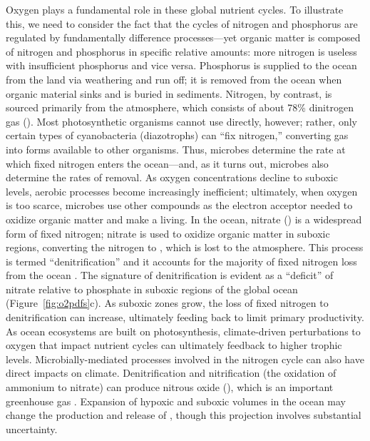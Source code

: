 \documentclass{report_chapter}
\begin{document}
Oxygen plays a fundamental role in these global nutrient cycles.
To illustrate this, we need to consider the fact that the cycles of nitrogen and phosphorus are regulated by fundamentally difference processes---yet organic matter is composed of nitrogen and phosphorus in specific relative amounts: more nitrogen is useless with insufficient phosphorus and vice versa.
Phosphorus is supplied to the ocean from the land via weathering and run off; it is removed from the ocean when organic material sinks and is buried in sediments.
Nitrogen, by contrast, is sourced primarily from the atmosphere, which consists of about 78\% dinitrogen gas (\NN{}).
Most photosynthetic organisms cannot use \NN{} directly, however; rather, only certain types of cyanobacteria (diazotrophs) can ``fix nitrogen,'' converting \NN{} gas into forms available to other organisms.
Thus, microbes determine the rate at which fixed nitrogen enters the ocean---and, as it turns out, microbes also determine the rates of removal.
As oxygen concentrations decline to suboxic levels, aerobic processes become increasingly inefficient; ultimately, when oxygen is too scarce, microbes use
other compounds as the electron acceptor needed to oxidize organic matter and make a living.
In the ocean, nitrate (\NOOO{}) is a widespread form of fixed nitrogen; nitrate is used to oxidize organic matter in suboxic regions, converting the nitrogen to \NN{}, which is lost to the atmosphere.
This process is termed ``denitrification'' and it accounts for the majority of fixed nitrogen loss from the ocean \citep{Gruber-2004,Gruber-Galloway-2008}.
The signature of denitrification is evident as a ``deficit'' of nitrate relative to phosphate in suboxic regions of the global ocean (Figure~\ref{fig:o2pdfs}c).
As suboxic zones grow, the loss of fixed nitrogen to denitrification can increase, ultimately feeding back to limit primary productivity.
As ocean ecosystems are built on photosynthesis, climate-driven perturbations to oxygen that impact nutrient cycles can ultimately feedback to higher trophic levels.
Microbially-mediated processes involved in the nitrogen cycle can also have direct impacts on climate.
Denitrification and nitrification (the oxidation of ammonium to nitrate) can produce nitrous oxide (\NNO{}), which is an important greenhouse gas \citep{Bange-Freing-etal-2010}.
Expansion of hypoxic and suboxic volumes in the ocean may change the production and release of \NNO{} \citep{Nevison-Butler-etal-2003,Martinez-Rey-Bopp-etal-2015}, though this projection involves substantial uncertainty.
\end{document}
